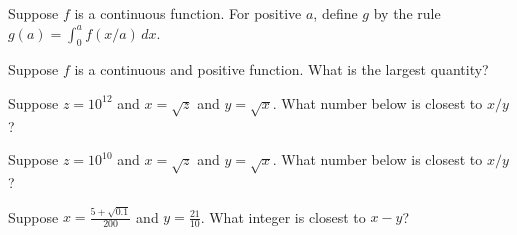 \documentclass{ximera}
\begin{document}
\begin{shuffle}


\begin{problem}
  Suppose $f$ is a continuous function.  For positive $a$, define $g$ by the rule $g(a) = \int_0^a f(x/a) \, dx$.
  \begin{multipleChoice}
  \end{multipleChoice}
\end{problem}

\begin{problem}
  Suppose $f$ is a continuous and positive function.  What is the largest quantity?
  \begin{multipleChoice}
  \end{multipleChoice}
\end{problem}



\begin{problem}
  Suppose $z = 10^{12}$ and $x = \sqrt{z}$ and $y = \sqrt{x}$.  What number below is closest to $x/y$?
  \begin{multipleChoice}
  \end{multipleChoice}
\end{problem}

\begin{problem}
  Suppose $z = 10^{10}$ and $x = \sqrt{z}$ and $y = \sqrt{x}$.  What number below is closest to $x/y$?
  \begin{multipleChoice}
  \end{multipleChoice}
\end{problem}

\begin{problem}
  Suppose $x = \frac{5 + \sqrt{0.1}}{200}$ and $y = \frac{21}{10}$.  What integer is closest to $x - y$?
  \begin{multipleChoice}
  \end{multipleChoice}
\end{problem}


\end{shuffle}
\end{document}
